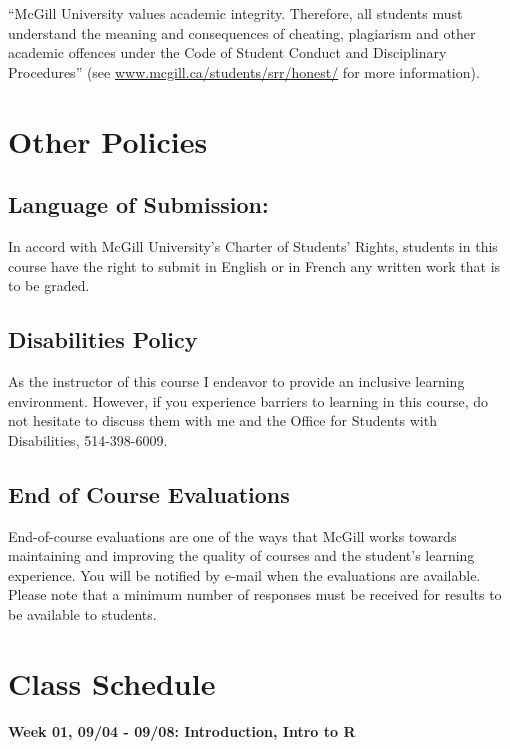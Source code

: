 \documentclass[11pt,]{article}
\begin{document}
``McGill University values academic integrity. Therefore, all students
must understand the meaning and consequences of cheating, plagiarism and
other academic offences under the Code of Student Conduct and
Disciplinary Procedures'' (see \url{www.mcgill.ca/students/srr/honest/}
for more information).

\section{Other Policies}\label{other-policies}

\subsection{Language of Submission:}\label{language-of-submission}

In accord with McGill University's Charter of Students' Rights, students
in this course have the right to submit in English or in French any
written work that is to be graded.

\subsection{Disabilities Policy}\label{disabilities-policy}

As the instructor of this course I endeavor to provide an inclusive
learning environment. However, if you experience barriers to learning in
this course, do not hesitate to discuss them with me and the Office for
Students with Disabilities, 514-398-6009.

\subsection{End of Course Evaluations}\label{end-of-course-evaluations}

End-of-course evaluations are one of the ways that McGill works towards
maintaining and improving the quality of courses and the student's
learning experience. You will be notified by e-mail when the evaluations
are available. Please note that a minimum number of responses must be
received for results to be available to students. \newpage

\section{Class Schedule}\label{class-schedule}

\paragraph{Week 01, 09/04 - 09/08: Introduction, Intro to
R}\label{week-01-0904---0908-introduction-intro-to-r}
\end{document}
